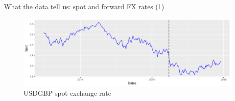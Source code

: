 \begin{frame}[fragile]{What the data tell us: spot and forward FX rates
(1)}

\begin{Shaded}
\begin{Highlighting}[]
\StringTok{ }\OperatorTok{+}\StringTok{ }\NormalTok{(}\NormalTok{) }
\StringTok{ }\OperatorTok{+}\StringTok{ }\NormalTok{(}\NormalTok{(}\NormalTok{((}\NormalTok{))),}
                     \NormalTok{)}
\end{Highlighting}
\end{Shaded}

\begin{figure}
\includegraphics[width=1\linewidth]{2018_02_07_IMF_FXCourse_files/figure-beamer/unnamed-chunk-8-1} \caption{USDGBP spot exchange rate}\label{fig:unnamed-chunk-8}
\end{figure}

\end{frame}

